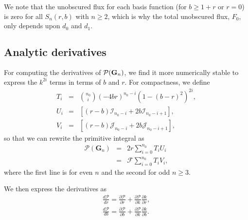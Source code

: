 \documentclass[modern]{aastex61}
\begin{document}
We note that the unobscured flux for each basis function (for $b \ge 1+r$ or $r=0$) is zero for
all $S_n(r,b)$ with $n \ge 2$, which is why the total unobscured flux,
$F_0$, only depends upon $d_0$ and $d_1$.

\subsection{Analytic derivatives}

For computing the derivatives of $\mathcal{P}({\mathbf{G}}_n)$, we find it more numerically 
stable to express the $k^{2i}$ terms in terms of $b$ and $r$.  For compactness, we define
\begin{eqnarray}
T_i &=&  \binom{n_0}{i}(-4br)^{n_0-i}(1-(b-r)^2)^{2i},\\
U_i &=&  \left[(r-b)\mathcal{I}_{n_0-i} + 2b \mathcal{I}_{n_0-i+1}\right],\\
V_i &=&  \left[(r-b)\mathcal{J}_{n_0-i} + 2b \mathcal{J}_{n_0-i+1}\right],
\end{eqnarray}
so that we can rewrite the primitive integral as
\begin{eqnarray}
\mathcal{P}(\mathbf{G}_n) &=& 2r \sum_{i=0}^{n_0} T_i U_i\\
&=& \mathcal{F} \sum_{i=0}^{n_0} T_i V_i,
\end{eqnarray}
where the first line is for even $n$ and the second for odd $n \ge 3$.

We then express the derivatives as
\begin{eqnarray}
\frac{d \mathcal{P}}{d r} = \frac{\partial \mathcal{P}}{\partial r}  +  \frac{\partial \mathcal{P}}{\partial k} \frac{\partial k}{\partial r},\\
\frac{d \mathcal{P}}{d b} = \frac{\partial \mathcal{P}}{\partial b}  +  \frac{\partial \mathcal{P}}{\partial k} \frac{\partial k}{\partial b}.
\end{eqnarray}
\end{document}

